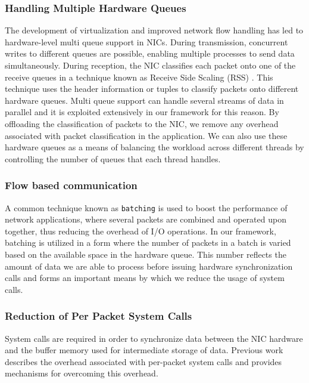 \documentclass[10pt, conference, compsocconf, reqno]{IEEEtran}
\newcommand{\comment}[1]{}
\begin{document}
\subsubsection{Handling Multiple Hardware Queues}

The development of virtualization and improved network flow handling has led to hardware-level multi queue support in NICs. During transmission, concurrent writes to different queues are possible, enabling multiple processes to send data simultaneously. During reception, the NIC classifies each packet onto one of the receive queues in a technique known as Receive Side Scaling (RSS)\cite{micro2008} \cite{intel2010}. This technique uses the header information or tuples to classify packets onto different hardware queues. Multi queue support can handle several streams of data in parallel and it is exploited extensively in our framework for this reason. By offloading the classification of packets to the NIC, we remove any overhead associated with packet classification in the application. We can also use these hardware queues as a means of balancing the workload across different threads by controlling the number of queues that each thread handles. \comment{Since different processes can access these transmit and receive queues, concurrent access to data is possible.}

\subsubsection{Flow based communication}

A common technique known as \texttt{batching} is used to boost the performance of network applications, where several packets are combined and operated upon together, thus reducing the overhead of I/O operations. In our framework, batching is utilized in a form where the number of packets in a batch is varied based on the available space in the hardware queue. This number reflects the amount of data we are able to process before issuing hardware synchronization calls and forms an important means by which we reduce the usage of system calls.

\subsubsection{Reduction of Per Packet System Calls}

System calls are required in order to synchronize data between the NIC hardware and the buffer memory used for intermediate storage of data. Previous work describes the overhead associated with per-packet system calls and provides mechanisms for overcoming this overhead\cite{1564468}\cite{Han:2010:PGS:1851275.1851207}\cite{Rizzo:2012:RNI:2090147.2103536}.
\end{document}
